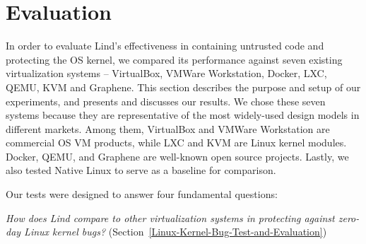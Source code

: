 \section{Evaluation}
\label{sec.evaluation}

In order to evaluate Lind's effectiveness in containing untrusted code and
protecting the OS kernel, we compared its performance against seven existing
virtualization systems -- VirtualBox, VMWare
Workstation, Docker, LXC, QEMU, KVM and Graphene. This section describes
the purpose and setup of our experiments, and presents and discusses our results.
We chose these seven systems because they are representative of the most
widely-used design models in different markets.
Among them, VirtualBox and VMWare Workstation are commercial OS VM products, while
LXC and KVM are Linux kernel modules. Docker, QEMU, and Graphene are well-known open
source projects. Lastly, we also tested Native Linux to serve as a
baseline for comparison.

Our tests were designed to answer four fundamental questions:

\textit{How does Lind compare to other virtualization systems
in protecting against zero-day Linux kernel bugs?}
(Section~{\ref{Linux-Kernel-Bug-Test-and-Evaluation}})

